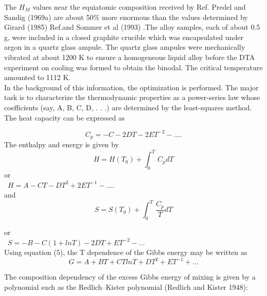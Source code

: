 \documentclass[12pt]{article}
\newcommand*{\1}{\hspace{1pt}}
\begin{document}
    The $ H _M $ values near the equiatomic composition received by Ref.\cite{s7} Predel and 
    Sandig (1969a) are about 50\% more enormous than the values determined by 
    Girard (1985) Ref.\cite{s8}and Sommer et al (1993) .The alloy samples, each of about 0.5 
    g, were included in a closed graphite crucible which was encapsulated under 
    argon in a quartz glass ampule. The quartz glass ampules were mechanically 
    vibrated at about 1200 K to ensure a homogeneous liquid alloy before the DTA 
    experiment on cooling was formed to obtain the binodal. The critical temperature 
    amounted to 1112 K. \\
        In the background of this information, the optimization 
    is performed. The major task is to characterize the thermodynamic properties 
    as a power-series law whose coefficients
    (say, A, B, C, D, . . .) are determined by the least-squares method. The 
    heat capacity can be expressed as

        \begin{equation}
            C _p = -C - 2DT -2ET^{-2} - ....
        \end{equation}
    The enthalpy and energy is given by\\

        \begin{equation}
            H = H(T _0) + \int_{0}^{T}  \,C _pdT
        \end{equation}
    or\\
        \  $ H = A - CT -DT^{2} + 2ET^{-1} - .... $ \\
    and
        \begin{equation}
            S = S(T_0) + \int_{0}^{T}  \,\frac{C _p}{T} dT 
        \end{equation}

    or\\
    \   $ S = -B -C(1 + lnT) - 2DT +ET^{-2} - ... $\\

    Using equation (5), the T dependence of the Gibbs energy may be written as\\

        \begin{equation}
            G = A + BT + CT ln T +DT^2 + ET^{-1} + ... 
        \end{equation}

    The composition dependency of the excess Gibbs energy of mixing 
    is given by a polynomial such as the Redlich–Kister polynomial 
    (Redlich and Kister 1948):
\end{document}
